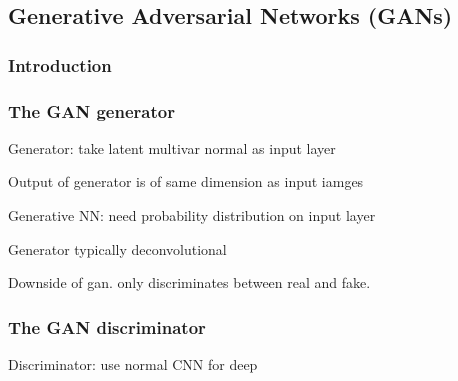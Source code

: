 
\subsection{Generative Adversarial Networks (GANs)}

\subsubsection{Introduction}

\subsubsection{The GAN generator}

Generator: take latent multivar normal as input layer

Output of generator is of same dimension as input iamges

Generative NN: need probability distribution on input layer

Generator typically deconvolutional

Downside of gan. only discriminates between real and fake.

\subsubsection{The GAN discriminator}

Discriminator: use normal CNN for deep




